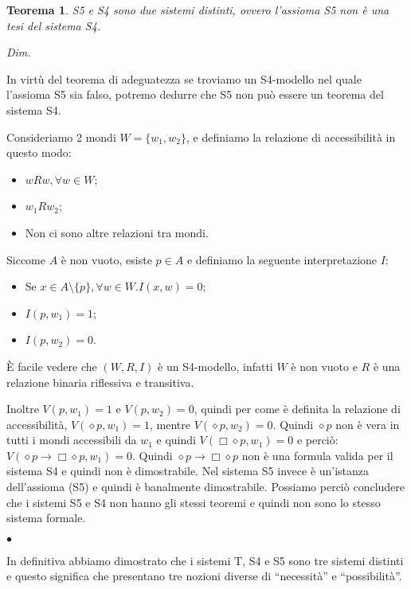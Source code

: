 \documentclass[a4paper, titlepage, 12pt]{report}
\newtheorem{theorem}{Teorema}[chapter]
\newenvironment{proof}
    {\textit{Dim.}
    }
    {\begin{flushright}$\bullet$\end{flushright}
    }
\begin{document}
\begin{theorem}
S5 e S4 sono due sistemi distinti, ovvero l'assioma S5 non è una tesi del sistema S4.
\end{theorem}

\begin{proof}

In virtù del teorema di adeguatezza se troviamo un S4-modello nel quale l'assioma S5
sia falso, potremo dedurre che S5 non può essere un teorema del sistema S4.

Consideriamo 2 mondi $W = \{w_1, w_2\}$, e definiamo la relazione di accessibilità
in questo modo:
\begin{itemize}
    \item $wRw, \forall w \in W$;
    \item $w_1Rw_2$;
    \item Non ci sono altre relazioni tra mondi.
\end{itemize}

Siccome $A$ è non vuoto, esiste $p \in A$ e definiamo la seguente interpretazione $I:$
\begin{itemize}
    \item Se $x \in A \setminus \{p\}, \forall w \in W. I(x, w) = 0$;
    \item $I(p, w_1) = 1$;
    \item $I(p, w_2) = 0$.
\end{itemize}

È facile vedere che $(W, R, I)$ è un S4-modello, infatti $W$ è non vuoto e
$R$ è una relazione binaria riflessiva e transitiva.

Inoltre $V(p, w_1) = 1$ e $V(p, w_2) = 0$, quindi per come è definita
la relazione di accessibilità, $V(\diamond p, w_1) = 1$, mentre
$V(\diamond p, w_2) = 0$. Quindi $\diamond p$ non è vera in tutti i mondi accessibili da $w_1$
e quindi $V(\Box \diamond p, w_1) = 0$ e perciò: $V(\diamond p \rightarrow \Box\diamond p, w_1) = 0$.
Quindi $\diamond p \rightarrow \Box\diamond p$ non è una formula valida per il sistema S4 e quindi
non è dimostrabile.
Nel sistema S5 invece è un'istanza dell'assioma (S5) e quindi è banalmente dimostrabile.
Possiamo perciò concludere che i sistemi S5 e S4 non hanno gli stessi teoremi e quindi non
sono lo stesso sistema formale.


\end{proof}

In definitiva abbiamo dimostrato che i sistemi T, S4 e S5 sono tre sistemi distinti
e questo significa che presentano tre nozioni diverse di ``necessità'' e ``possibilità''.
\end{document}
